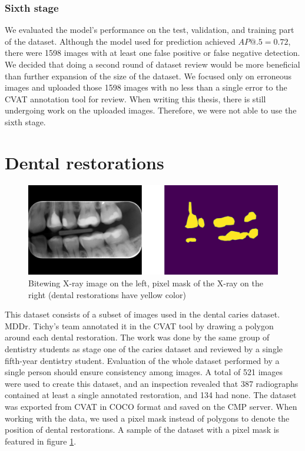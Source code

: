 \subsubsection{Sixth stage}
\label{sec:dataset:sixth_stage}
We evaluated the model's performance on the test, validation, and training part of the dataset. Although the model used for prediction achieved $AP@.5 = 0.72$, there were 1598 images with at least one false positive or false negative detection. We decided that doing a second round of dataset review would be more beneficial than further expansion of the size of the dataset. We focused only on erroneous images and uploaded those 1598 images with no less than a single error to the CVAT annotation tool for review. When writing this thesis, there is still undergoing work on the uploaded images. Therefore, we were not able to use the sixth stage.


\section{Dental restorations}
\label{sec:dataset:dental_rotorations}
\begin{figure}
    \centering
    \includegraphics[width=\linewidth]{images/segmentation_ds_sample.pdf}
    \caption{Bitewing X-ray image on the left, pixel mask of the X-ray on the right (dental restorations have yellow color)}
    \label{fig:segmentation_sample}
\end{figure}
This dataset consists of a subset of images used in the dental caries dataset. MDDr. Tichy's team annotated it in the CVAT tool by drawing a polygon around each dental restoration. The work was done by the same group of dentistry students as stage one of the caries dataset and reviewed by a single fifth-year dentistry student. Evaluation of the whole dataset performed by a single person should ensure consistency among images. A total of 521 images were used to create this dataset, and an inspection revealed that 387 radiographs contained at least a single annotated restoration, and 134 had none.
The dataset was exported from CVAT in COCO format and saved on the CMP server. When working with the data, we used a pixel mask instead of polygons to denote the position of dental restorations. A sample of the dataset with a pixel mask is featured in figure \ref{fig:segmentation_sample}.

